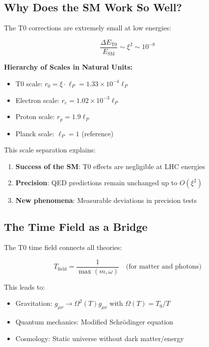 	\subsection{Why Does the SM Work So Well?}
	
	The T0 corrections are extremely small at low energies:
	
	\begin{equation}
		\frac{\Delta E_{\text{T0}}}{E_{\text{SM}}} \sim \xi^2 \sim 10^{-8}
	\end{equation}
	
	\textbf{Hierarchy of Scales in Natural Units:}
	\begin{itemize}
		\item T0 scale: $r_0 = \xi \cdot \ell_P = 1.33 \times 10^{-4} \ell_P$
		\item Electron scale: $r_e = 1.02 \times 10^{-3} \ell_P$
		\item Proton scale: $r_p = 1.9 \ell_P$
		\item Planck scale: $\ell_P = 1$ (reference)
	\end{itemize}
	
	This scale separation explains:
	\begin{enumerate}
		\item \textbf{Success of the SM}: T0 effects are negligible at LHC energies
		\item \textbf{Precision}: QED predictions remain unchanged up to $O(\xi^2)$
		\item \textbf{New phenomena}: Measurable deviations in precision tests
	\end{enumerate}
	
	\subsection{The Time Field as a Bridge}
	
	The T0 time field connects all theories:
	
	\begin{equation}
		T_{\text{field}} = \frac{1}{\max(m, \omega)} \quad \text{(for matter and photons)}
	\end{equation}
	
	This leads to:
	\begin{itemize}
		\item Gravitation: $g_{\mu\nu} \to \Omega^2(T) g_{\mu\nu}$ with $\Omega(T) = T_0/T$
		\item Quantum mechanics: Modified Schrödinger equation
		\item Cosmology: Static universe without dark matter/energy
	\end{itemize}
	
